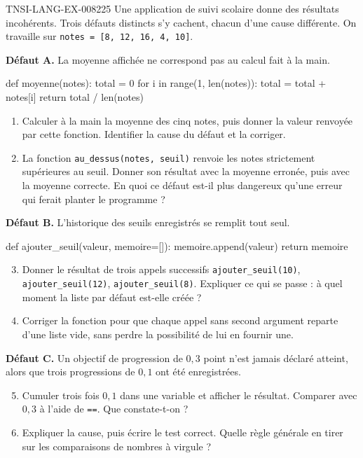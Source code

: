 \begin{exercice}{TNSI-LANG-EX-008}{2}{25}
Une application de suivi scolaire donne des résultats incohérents. Trois défauts
distincts s'y cachent, chacun d'une cause différente. On travaille sur
\lstinline{notes = [8, 12, 16, 4, 10]}.

\medskip
\textbf{Défaut A.} La moyenne affichée ne correspond pas au calcul fait à la main.
\begin{python}
def moyenne(notes):
    total = 0
    for i in range(1, len(notes)):
        total = total + notes[i]
    return total / len(notes)
\end{python}
\begin{enumerate}
  \item Calculer à la main la moyenne des cinq notes, puis donner la valeur
    renvoyée par cette fonction. Identifier la cause du défaut et la corriger.
  \item La fonction \lstinline{au_dessus(notes, seuil)} renvoie les notes
    strictement supérieures au seuil. Donner son résultat avec la moyenne
    erronée, puis avec la moyenne correcte. En quoi ce défaut est-il plus
    dangereux qu'une erreur qui ferait planter le programme ?
\end{enumerate}

\medskip
\textbf{Défaut B.} L'historique des seuils enregistrés se remplit tout seul.
\begin{python}
def ajouter_seuil(valeur, memoire=[]):
    memoire.append(valeur)
    return memoire
\end{python}
\begin{enumerate}
  \setcounter{enumi}{2}
  \item Donner le résultat de trois appels successifs
    \lstinline{ajouter_seuil(10)}, \lstinline{ajouter_seuil(12)},
    \lstinline{ajouter_seuil(8)}. Expliquer ce qui se passe : à quel moment la
    liste par défaut est-elle créée ?
  \item Corriger la fonction pour que chaque appel sans second argument reparte
    d'une liste vide, sans perdre la possibilité de lui en fournir une.
\end{enumerate}

\medskip
\textbf{Défaut C.} Un objectif de progression de $0{,}3$ point n'est jamais
déclaré atteint, alors que trois progressions de $0{,}1$ ont été enregistrées.
\begin{enumerate}
  \setcounter{enumi}{4}
  \item Cumuler trois fois $0{,}1$ dans une variable et afficher le résultat.
    Comparer avec $0{,}3$ à l'aide de \lstinline{==}. Que constate-t-on ?
  \item Expliquer la cause, puis écrire le test correct. Quelle règle générale
    en tirer sur les comparaisons de nombres à virgule ?
\end{enumerate}
\end{exercice}
